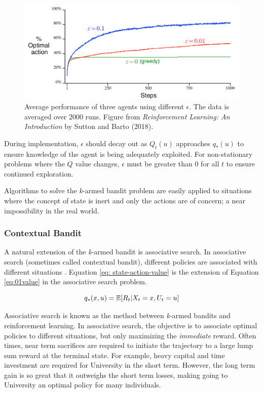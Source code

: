 \begin{figure}[H]
    \centering
    \includegraphics[scale=0.35]{images/eps_vs_optAction.png}
    \caption{Average performance of three agents using different $\epsilon$.  The data is averaged over 2000 runs.  Figure from \textit{Reinforcement Learning: An Introduction} by Sutton and Barto (2018).}
    \label{fig: eps_figure}
\end{figure}

During implementation, $\epsilon$ should decay out as $Q_t(u)$ approaches $q_*(u)$ to ensure knowledge of the agent is being adequately exploited. For non-stationary problems where the $Q$ value changes, $\epsilon$ must be greater than 0 for all $t$ to ensure continued exploration.

Algorithms to solve the \textit{k}-armed bandit problem are easily applied to situations where the concept of state is inert and only the actions are of concern;  a near impossibility in the real world.  

\subsubsection{Contextual Bandit}

A natural extension of the \textit{k}-armed bandit is associative search.  In associative search (sometimes called contextual bandit), different policies are associated with different situations \cite{bartosuttonbrouwer}.  Equation \ref{eq: state-action-value} is the extension of Equation \ref{eq:01value} in the associative search problem.

\begin{equation}
    \centering
    q_*(x, u) = \mathbb{E}[R_t | X_t = x, U_t = u]
    \label{eq: state-action-value}
\end{equation}

Associative search is known as the method between \textit{k}-armed bandits and reinforcement learning.  In associative search, the objective is to associate optimal policies to different situations, but only maximizing the \textit{immediate} reward.  Often times, near term sacrifices are required to initiate the trajectory to a large lump sum reward at the terminal state.  For example, heavy capital and time investment are required for University in the short term.  However, the long term gain is so great that it outweighs the short term losses, making going to University an optimal policy for many individuals.

